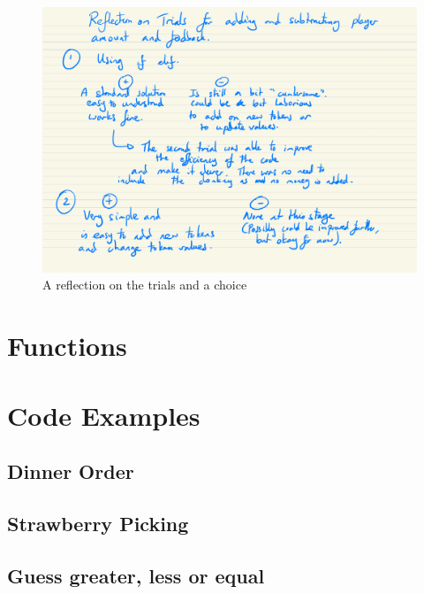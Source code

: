 \documentclass[a4paper,12pt]{article}
\begin{document}
\newpage

\begin{figure} [!h]
	\centering
	\includegraphics[width=15cm]{iterative_processes/Lucky_Unicorn_Sub_problems_3_a.pdf}
	\caption*{A reflection on the trials and a choice}
\end{figure}

\newpage

\newpage

\section{Functions}


\newpage
\section{Code Examples}
\subsection{Dinner Order}

\subsection{Strawberry Picking}

\subsection{Guess greater, less or equal}

\end{document}
